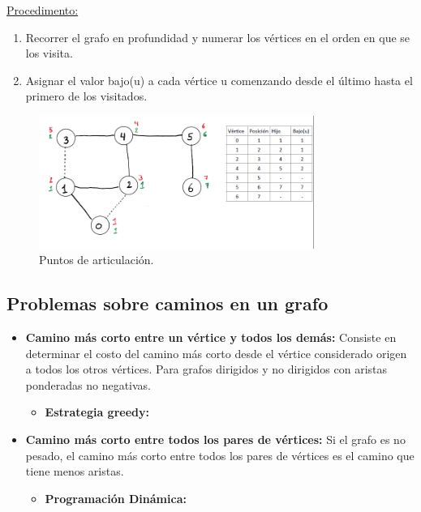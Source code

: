 \documentclass[../main.tex]{subfiles}
\begin{document}
            \underline{Procedimento:}
            \begin{enumerate}
                \item Recorrer el grafo en profundidad y numerar los vértices en el orden en que se los visita.
                \item Asignar el valor bajo(u) a cada vértice u comenzando desde el último hasta el primero de los visitados.
            \end{enumerate}

            \begin{figure}[ht]
                \centering
                \includegraphics[width=0.8\textwidth]{images/grafos/puntos_articulacion.png}
                \caption{Puntos de articulación.}
                \label{fig:puntos_articulacion}
            \end{figure}

    \subsection{Problemas sobre caminos en un grafo}
                \begin{itemize}
                    \item \textbf{Camino más corto entre un vértice y todos los demás:} Consiste en determinar el costo del camino más corto desde el vértice considerado origen a todos los otros vértices. Para grafos dirigidos y no dirigidos con aristas ponderadas no negativas.
                        \begin{itemize}
                            \item \textbf{Estrategia greedy:} 
                        \end{itemize}
                    \item \textbf{Camino más corto entre todos los pares de vértices:} Si el grafo es no pesado, el camino más corto entre todos los pares de vértices es el camino que tiene menos aristas.
                        \begin{itemize}
                            \item \textbf{Programación Dinámica:} 
                        \end{itemize}
                \end{itemize}
\end{document}
